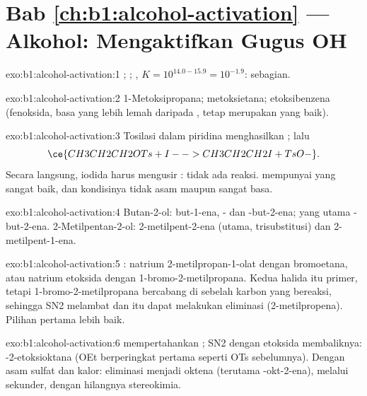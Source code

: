 \section*{Bab \ref{ch:b1:alcohol-activation} --- Alkohol: Mengaktifkan Gugus OH}

\begin{solution}{exo:b1:alcohol-activation:1}
;
;
, $K = 10^{14.0 - 15.9} = 10^{-1.9}$:
sebagian.
\end{solution}

\begin{solution}{exo:b1:alcohol-activation:2}
1-Metoksipropana; metoksietana; etoksibenzena (fenoksida, basa yang lebih
lemah daripada , tetap merupakan  yang baik).
\end{solution}

\begin{solution}{exo:b1:alcohol-activation:3}
Tosilasi dalam piridina menghasilkan ; lalu
\[ \ce{CH3CH2CH2OTs + I- -> CH3CH2CH2I + TsO-}. \] Secara langsung, iodida harus
mengusir : tidak ada reaksi.  mempunyai  yang
sangat baik, dan kondisinya tidak asam maupun sangat basa.
\end{solution}

\begin{solution}{exo:b1:alcohol-activation:4}
Butan-2-ol: but-1-ena, - dan -but-2-ena; yang utama
-but-2-ena. 2-Metilpentan-2-ol: 2-metilpent-2-ena (utama,
trisubstitusi) dan 2-metilpent-1-ena.
\end{solution}

\begin{solution}{exo:b1:alcohol-activation:5}
: natrium 2-metilpropan-1-olat dengan bromoetana,
atau natrium etoksida dengan 1-bromo-2-metilpropana. Kedua halida itu
primer, tetapi 1-bromo-2-metilpropana bercabang di sebelah karbon yang
bereaksi, sehingga SN2 melambat dan  itu dapat melakukan eliminasi
(2-metilpropena). Pilihan pertama lebih baik.
\end{solution}

\begin{solution}{exo:b1:alcohol-activation:6}
 mempertahankan  ; SN2 dengan etoksida
membaliknya: -2-etoksioktana (OEt berperingkat pertama seperti OTs
sebelumnya). Dengan asam sulfat dan kalor: eliminasi menjadi oktena
(terutama -okt-2-ena), melalui  sekunder, dengan
hilangnya stereokimia.
\end{solution}


